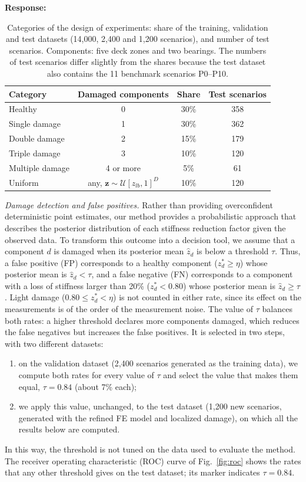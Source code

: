 \documentclass[11pt]{article}
\newenvironment{response}{\par\smallskip\noindent\color{resp}\textbf{Response:}\ }{\par}
\newcommand{\z}{\mathbf{z}}
\begin{document}
\begin{response}
\begin{table}[H]
\centering\small
\caption{Categories of the design of experiments: share of the training, validation and test datasets (14,000, 2,400 and
1,200 scenarios), and number of test scenarios. Components: five deck zones and two bearings. The numbers of test
scenarios differ slightly from the shares because the test dataset also contains the 11 benchmark scenarios P0--P10.}
\label{tab:doe}
\begin{tabular}{lccc}
\toprule
Category & Damaged components & Share & Test scenarios \\
\midrule
Healthy & 0 & 30\% & 358 \\
Single damage & 1 & 30\% & 362 \\
Double damage & 2 & 15\% & 179 \\
Triple damage & 3 & 10\% & 120 \\
Multiple damage & 4 or more & 5\% & 61 \\
Uniform & any, $\z\sim\mathcal{U}[z_{lb},1]^D$ & 10\% & 120 \\
\bottomrule
\end{tabular}
\end{table}

\textit{Damage detection and false positives.}
Rather than providing overconfident deterministic point estimates, our method provides a probabilistic approach that
describes the posterior distribution of each stiffness reduction factor given the observed data. To transform this
outcome into a decision tool, we assume that a component $d$ is damaged when its posterior mean $\hat z_d$ is below a
threshold $\tau$. Thus, a false positive (FP) corresponds to a healthy component ($z_d^*\ge\eta$) whose posterior mean
is $\hat z_d<\tau$, and a false negative (FN) corresponds to a component with a loss of stiffness larger than 20\%
($z_d^*<0.80$) whose posterior mean is $\hat z_d\ge\tau$. Light damage ($0.80\le z_d^*<\eta$) is not counted in either
rate, since its effect on the measurements is of the order of the measurement noise. The value of $\tau$ balances both
rates: a higher threshold declares more components damaged, which reduces the false negatives but increases the false
positives. It is selected in two steps, with two different datasets:
\begin{enumerate}[leftmargin=*,label=(\roman*)]
\item on the validation dataset (2,400 scenarios generated as the training data), we compute both rates for every value of
$\tau$ and select the value that makes them equal, $\tau=0.84$ (about 7\% each);
\item we apply this value, unchanged, to the test dataset (1,200 new scenarios, generated with the refined FE model and
localized damage), on which all the results below are computed.
\end{enumerate}
In this way, the threshold is not tuned on the data used to evaluate the method. The receiver operating characteristic
(ROC) curve of Fig.~\ref{fig:roc} shows the rates that any other threshold gives on the test dataset; its marker
indicates $\tau=0.84$.


\end{response}
\end{document}
